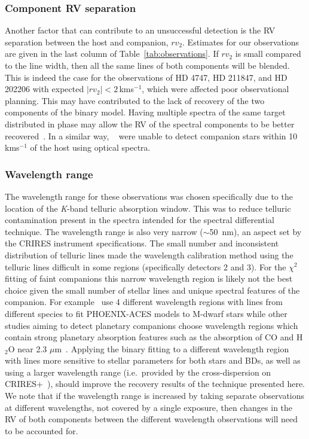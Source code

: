 \documentclass[fleqn,usenatbib]{mnras}
\newcommand{\kmps}{\,kms\(^{-1}\)}	%
\newcommand*\bl{\color{blue}}
\begin{document}
    \subsubsection{Component RV separation}
    \label{subsubsec:rv_seperation}
    Another factor {\bl that can} contribute to an unsuccessful detection is the RV separation between the host and companion, \(rv_2\). Estimates for our observations are given in the last column of Table~\ref{tab:observations}. If \({rv}_2\) is small compared to the line width, then all the same lines of both components will be blended. This is indeed the case for the observations of {HD 4747}, {HD 211847}, and {HD 202206} with expected \(|{rv}_2| < 2\)\kmps{}, {\bl which were affected poor observational planning. This may have contributed to the lack of recovery of the two components of the binary model.}  Having multiple spectra of the same target distributed in phase may allow the RV of the spectral components to be better recovered~\citep[e.g.][]{czekala_disentangling_2017, sablowski_spectral_2016}.
    {\bl In a similar way, ~\citet{kolbl_detection_2015} were unable to detect companion stars within 10\kmps{} of the host using optical spectra}.
    
    \subsubsection{Wavelength range}
    \label{subsubsec:wavelenght_range_limitation}
    The wavelength range for these observations was chosen specifically due to the location of the \textit{K}-band telluric absorption window. This was to reduce telluric contamination present in the spectra intended for the spectral differential technique. {\bl The wavelength range is also very narrow (\(\sim\)50~nm), an aspect set by the CRIRES instrument specifications.} The small number and inconsistent distribution of telluric lines made the wavelength calibration method using the telluric lines difficult in some regions (specifically detectors 2 and 3). For the $\chi^2$ fitting of faint companions this narrow wavelength region is likely not the best choice given the small number of stellar lines and unique spectral features of the companion. For example~\citet{passegger_fundamental_2016} use 4 different wavelength regions with lines from different species to fit PHOENIX-ACES models to M-dwarf stars while other studies aiming to detect planetary companions choose wavelength regions which contain strong planetary absorption features such as the absorption of CO and H$_2$O near 2.3 $\mu$m~\citep[e.g.][]{dekok_detection_2013, brogi_carbon_2014}.
    Applying the binary fitting to a different wavelength region with lines more sensitive to stellar parameters for both stars and BDs, as well as using a larger wavelength range (i.e.\ provided by the cross-dispersion on CRIRES+~\citep{dorn_crires_2016}), should improve the recovery results of the technique presented here. We note that if the wavelength range is increased by taking separate observations at different wavelengths, not covered by a single exposure, then changes in the RV of both components between the different wavelength observations will need to be accounted for.
    
\end{document}
